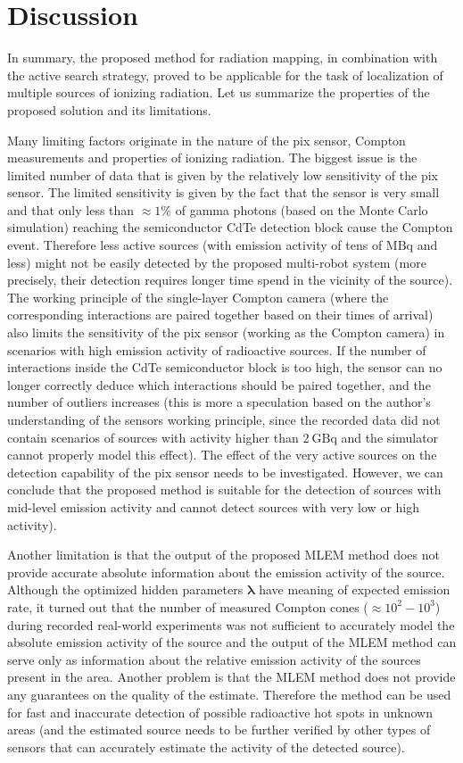 \section{Discussion}
In summary, the proposed method for radiation mapping, in combination with the active search strategy, proved to be applicable for the task of localization of multiple sources of ionizing radiation.
Let us summarize the properties of the proposed solution and its limitations.

Many limiting factors originate in the nature of the \ac{pix} sensor, Compton measurements and properties of ionizing radiation.
The biggest issue is the limited number of data that is given by the relatively low sensitivity of the \ac{pix} sensor.
The limited sensitivity is given by the fact that the sensor is very small and that only less than $\approx 1\%$ of gamma photons (based on the Monte Carlo simulation) reaching the semiconductor \ac{CdTe} detection block cause the Compton event.
Therefore less active sources (with emission activity of tens of $\si{\mega\becquerel}$ and less) might not be easily detected by the proposed multi-robot system (more precisely, their detection requires longer time spend in the vicinity of the source).
The working principle of the single-layer Compton camera (where the corresponding interactions are paired together based on their times of arrival) 
also limits the sensitivity of the \ac{pix} sensor (working as the Compton camera) in scenarios with high emission activity of radioactive sources.
If the number of interactions inside the \ac{CdTe} semiconductor block is too high, the sensor can no longer correctly deduce which interactions should be paired together, and the number of outliers increases (this is more a speculation based on the author's understanding of the sensors working principle, since the recorded data did not contain scenarios of sources with activity higher than $\SI{2}{\giga\becquerel}$ and the simulator cannot properly model this effect).
The effect of the very active sources on the detection capability of the \ac{pix} sensor needs to be investigated.
However, we can conclude that the proposed method is suitable for the detection of sources with mid-level emission activity and cannot detect sources with very low or high activity).

Another limitation is that the output of the proposed \ac{MLEM} method does not provide accurate absolute information about the emission activity of the source.
Although the optimized hidden parameters $\bm{\lambda}$ have meaning of expected emission rate, 
it turned out that the number of measured Compton cones ($\approx 10^{2}-10^{3}$) during recorded real-world experiments was not sufficient to accurately model the absolute emission activity of the source
and the output of the \ac{MLEM} method can serve only as information about the relative emission activity of the sources present in the area.
Another problem is that the \ac{MLEM} method does not provide any guarantees on the quality of the estimate.
Therefore the method can be used for fast and inaccurate detection of possible radioactive hot spots in unknown areas (and the estimated source needs to be further verified by other types of sensors that can accurately estimate the activity of the detected source).

